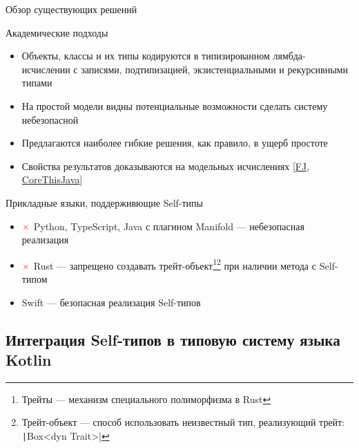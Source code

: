 \documentclass[usenames, dvipsnames]{beamer}
\begin{document}
    \begin{frame}{Обзор существующих решений}
        \begin{block}{Академические подходы}
            \begin{itemize}
                \item Объекты, классы и их типы кодируются в типизированном лямбда-исчислении с записями, подтипизацией, экзистенциальными и рекурсивными типами
                \item На простой модели видны потенциальные возможности сделать систему небезопасной
                \item Предлагаются наиболее гибкие решения, как правило, в ущерб простоте
                \item Свойства результатов доказываются на модельных исчислениях [\href{https://dl.acm.org/doi/pdf/10.1145/503502.503505}{FJ}, \href{https://dl.acm.org/doi/pdf/10.1145/2888392}{CoreThisJava}]
            \end{itemize}
        \end{block}

        \begin{block}{Прикладные языки, поддерживющие Self-типы}
            \begin{itemize}
                \item $\color{red} \mathbf{\times}$ Python, TypeScript, Java с плагином Manifold --- небезопасная реализация
                \item $\color{red} \mathbf{\times}$ Rust --- запрещено создавать трейт-объект\footnote{Трейты --- механизм специального полиморфизма в Rust}\footnote{Трейт-объект --- способ использовать неизвестный тип, реализующий трейт: \texttt|Box<dyn Trait>|} при наличии метода с Self-типом
                \item Swift --- безопасная реализация Self-типов
            \end{itemize}
        \end{block}
    \end{frame}


    \subsection{Интеграция Self-типов в типовую систему языка Kotlin}
\end{document}
